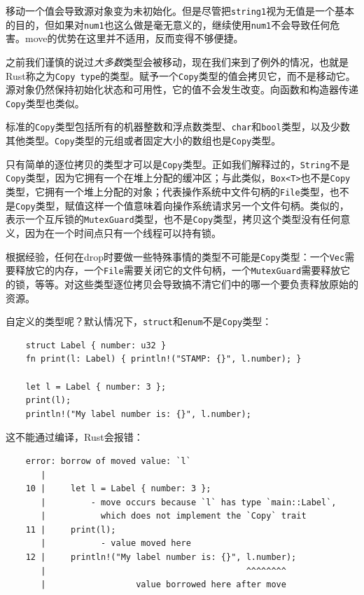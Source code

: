移动一个值会导致源对象变为未初始化。但是尽管把\texttt{string1}视为无值是一个基本的目的，但如果对\texttt{num1}也这么做是毫无意义的，继续使用\texttt{num1}不会导致任何危害。move的优势在这里并不适用，反而变得不够便捷。

之前我们谨慎的说过\emph{大多数}类型会被移动，现在我们来到了例外的情况，也就是Rust称之为\texttt{Copy type}的类型。赋予一个\texttt{Copy}类型的值会拷贝它，而不是移动它。源对象仍然保持初始化状态和可用性，它的值不会发生改变。向函数和构造器传递\texttt{Copy}类型也类似。

标准的\texttt{Copy}类型包括所有的机器整数和浮点数类型、\texttt{char}和\texttt{bool}类型，以及少数其他类型。\texttt{Copy}类型的元组或者固定大小的数组也是\texttt{Copy}类型。

只有简单的逐位拷贝的类型才可以是\texttt{Copy}类型。正如我们解释过的，\texttt{String}不是\texttt{Copy}类型，因为它拥有一个在堆上分配的缓冲区；与此类似，\texttt{Box<T>}也不是\texttt{Copy}类型，它拥有一个堆上分配的对象；代表操作系统中文件句柄的\texttt{File}类型，也不是\texttt{Copy}类型，赋值这样一个值意味着向操作系统请求另一个文件句柄。类似的，表示一个互斥锁的\texttt{MutexGuard}类型，也不是\texttt{Copy}类型，拷贝这个类型没有任何意义，因为在一个时间点只有一个线程可以持有锁。

根据经验，任何在drop时要做一些特殊事情的类型不可能是\texttt{Copy}类型：一个\texttt{Vec}需要释放它的内存，一个\texttt{File}需要关闭它的文件句柄，一个\texttt{MutexGuard}需要释放它的锁，等等。对这些类型逐位拷贝会导致搞不清它们中的哪一个要负责释放原始的资源。

自定义的类型呢？默认情况下，\texttt{struct}和\texttt{enum}不是\texttt{Copy}类型：
\begin{verbatim}
    struct Label { number: u32 }
    fn print(l: Label) { println!("STAMP: {}", l.number); }

    let l = Label { number: 3 };
    print(l);
    println!("My label number is: {}", l.number);
\end{verbatim}

这不能通过编译，Rust会报错：
\begin{verbatim}
    error: borrow of moved value: `l`
       |
    10 |     let l = Label { number: 3 };
       |         - move occurs because `l` has type `main::Label`,
       |           which does not implement the `Copy` trait
    11 |     print(l);
       |           - value moved here
    12 |     println!("My label number is: {}", l.number);
       |                                        ^^^^^^^^
       |                  value borrowed here after move
\end{verbatim}

